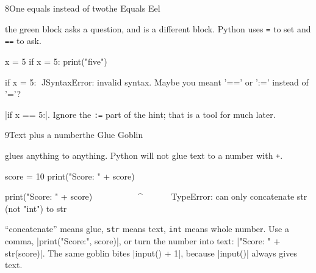 \begin{bzcard}{8}{One equals instead of two}{the Equals Eel}
\noindent\begin{minipage}[c]{0.43\linewidth}
 the green \chip[operators]{( ) = ( )} block asks a question, and  is a different block. Python uses \texttt{=} to set and \texttt{==} to ask.
\end{minipage}\hfill
\begin{minipage}[c]{0.54\linewidth}
\begin{bzsnip}
x = 5
if x = 5:
    print("five")
\end{bzsnip}
\end{minipage}\par
\begin{bzerror}
    if x = 5:
       ^^^^^
SyntaxError: invalid syntax. Maybe you meant '==' or ':=' instead of '='?
\end{bzerror}
 \py|if x == 5:|. Ignore the \texttt{:=} part of the hint; that is a tool for much later.
\end{bzcard}

\begin{bzcard}{9}{Text plus a number}{the Glue Goblin}
\noindent\begin{minipage}[c]{0.43\linewidth}
  glues anything to anything. Python will not glue text to a number with \texttt{+}.
\end{minipage}\hfill
\begin{minipage}[c]{0.54\linewidth}
\begin{bzsnip}
score = 10
print("Score: " + score)
\end{bzsnip}
\end{minipage}\par
\begin{bzerror}
    print("Score: " + score)
          ~~~~~~~~~~^~~~~~~
TypeError: can only concatenate str (not "int") to str
\end{bzerror}
 ``concatenate'' means glue, \texttt{str} means text, \texttt{int} means whole number. Use a comma, \py|print("Score:", score)|, or turn the number into text: \py|"Score: " + str(score)|. The same goblin bites \py|input() + 1|, because \py|input()| always gives text.
\end{bzcard}

